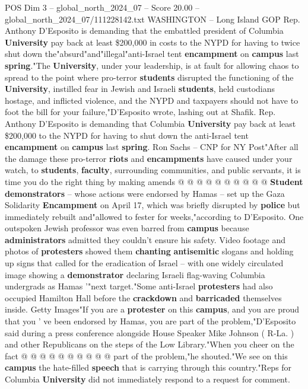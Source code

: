 \begin{textsample}{POS Dim 3 – global\_north\_2024\_07 – Score 20.00 – global\_north\_2024\_07/111228142.txt}  \label{ex:f3_pos_082}
WASHINGTON -- Long Island GOP Rep.
Anthony D'Esposito is demanding that the embattled president of Columbia \textbf{University} pay back at least \$200,000 in costs to the NYPD for having to twice shut down the"absurd"and"illegal"anti-Israel tent \textbf{encampment} on \textbf{campus} last \textbf{spring}."The \textbf{University}, under your leadership, is at fault for allowing chaos to spread to the point where pro-terror \textbf{students} disrupted the functioning of the \textbf{University}, instilled fear in Jewish and Israeli \textbf{students}, held custodians hostage, and inflicted violence, and the NYPD and taxpayers should not have to foot the bill for your failure,"D'Esposito wrote, lashing out at Shafik.
Rep.
Anthony D'Esposito is demanding that Columbia \textbf{University} pay back at least \$200,000 to the NYPD for having to shut down the anti-Israel tent \textbf{encampment} on \textbf{campus} last \textbf{spring}.
Ron Sachs -- CNP for NY Post"After all the damage these pro-terror \textbf{riots} and \textbf{encampments} have caused under your watch, to \textbf{students}, \textbf{faculty}, surrounding communities, and public servants, it is time you do the right thing by making amends @ @ @ @ @ @ @ @ @ @ \textbf{Student} \textbf{demonstrators} -- whose actions were endorsed by Hamas -- set up the Gaza Solidarity \textbf{Encampment} on April 17, which was briefly disrupted by \textbf{police} but immediately rebuilt and"allowed to fester for weeks,"according to D'Esposito.
One outspoken Jewish professor was even barred from \textbf{campus} because \textbf{administrators} admitted they couldn't ensure his safety.
Video footage and photos of \textbf{protesters} showed them \textbf{chanting} \textbf{antisemitic} slogans and holding up signs that called for the eradication of Israel -- with one widely circulated image showing a \textbf{demonstrator} declaring Israeli flag-waving Columbia undergrads as Hamas '"next target."Some anti-Israel \textbf{protesters} had also occupied Hamilton Hall before the \textbf{crackdown} and \textbf{barricaded} themselves inside.
Getty Images"If you are a \textbf{protester} on this \textbf{campus}, and you are proud that you ' ve been endorsed by Hamas, you are part of the problem,"D'Esposito said during a press conference alongside House Speaker Mike Johnson ( R-La. ) and other Republicans on the steps of the Low Library."When you cheer on the fact @ @ @ @ @ @ @ @ @ @ part of the problem,"he shouted."We see on this \textbf{campus} the hate-filled \textbf{speech} that is carrying through this country."Reps for Columbia \textbf{University} did not immediately respond to a request for comment.

\end{textsample}
